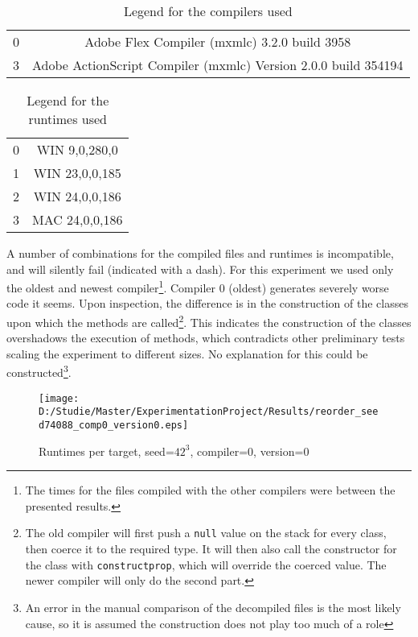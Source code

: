 \documentclass[a4paper,11pt]{scrartcl}
\begin{document}
\begin{table}[h!]
\begin{center}
\begin{tabular}{c|c}
0 & Adobe Flex Compiler (mxmlc) 3.2.0 build 3958 \\
3 & Adobe ActionScript Compiler (mxmlc) Version 2.0.0 build 354194 \\
\end{tabular}
\end{center}
\caption{Legend for the compilers used}
\label{tbl:reorder-compilers}
\end{table}

\begin{table}[h!]
\begin{center}
\begin{tabular}{c|c}
0 & WIN 9,0,280,0 \\
1 & WIN 23,0,0,185 \\
2 & WIN 24,0,0,186 \\
3 & MAC 24,0,0,186 \\
\end{tabular}
\end{center}
\caption{Legend for the runtimes used}
\label{tbl:reorder-runtimes}
\end{table}

A number of combinations for the compiled files and runtimes is incompatible, and will silently fail (indicated with a dash). For this experiment we used only the oldest and newest compiler\footnote{The times for the files compiled with the other compilers were between the presented results.}. Compiler 0 (oldest) generates severely worse code it seems. Upon inspection, the difference is in the construction of the classes upon which the methods are called\footnote{The old compiler will first push a \texttt{null} value on the stack for every class, then coerce it to the required type. It will then also call the constructor for the class  with \texttt{constructprop}, which will override the coerced value. The newer compiler will only do the second part.}. This indicates the construction of the classes overshadows the execution of methods, which contradicts other preliminary tests scaling the experiment to different sizes. No explanation for this could be constructed\footnote{An error in the manual comparison of the decompiled files is the most likely cause, so it is assumed the construction does not play too much of a role}.

\begin{figure}[h!]
\centering
\texttt{[image: D:/Studie/Master/ExperimentationProject/Results/reorder\_seed74088\_comp0\_version0.eps]}
\caption{Runtimes per target, seed=$42^3$, compiler=0, version=0}
\label{fig:reorder-plot}
\end{figure}
\end{document}
